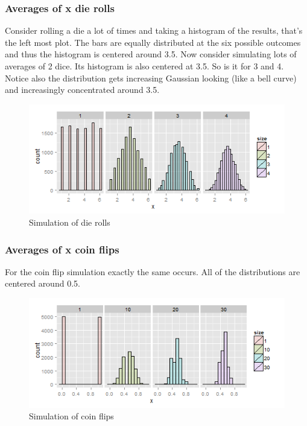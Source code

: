 \documentclass[]{article}
\begin{document}
\subsubsection{Averages of x die rolls}\label{averages-of-x-die-rolls}

Consider rolling a die a lot of times and taking a histogram of the
results, that's the left most plot. The bars are equally distributed at
the six possible outcomes and thus the histogram is centered around 3.5.
Now consider simulating lots of averages of 2 dice. Its histogram is
also centered at 3.5. So is it for 3 and 4. Notice also the distribution
gets increasing Gaussian looking (like a bell curve) and increasingly
concentrated around 3.5.

\begin{figure}[htbp]
\centering
\includegraphics{LeanPub/images/dieRollSimulationMean-1.png}
\caption{Simulation of die rolls}
\end{figure}

\subsubsection{Averages of x coin flips}\label{averages-of-x-coin-flips}

For the coin flip simulation exactly the same occurs. All of the
distributions are centered around 0.5.

\begin{figure}[htbp]
\centering
\includegraphics{LeanPub/images/coinFlipSimulationMean-1.png}
\caption{Simulation of coin flips}
\end{figure}
\end{document}
